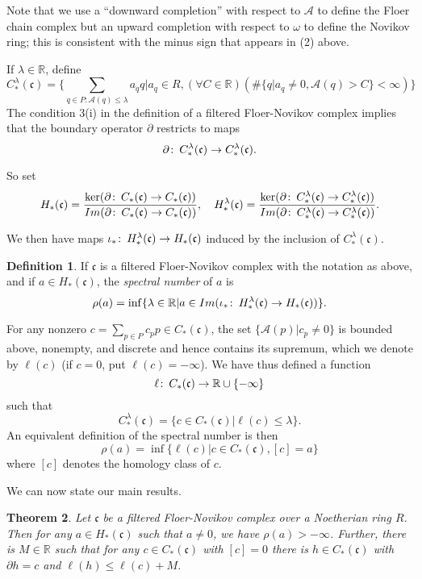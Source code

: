 \documentclass{amsart}
\theoremstyle{plain}
\newtheorem{theorem}{Theorem}[section]
\theoremstyle{definition}
\newtheorem{definition}[theorem]{Definition}
\theoremstyle{remark}
\def\co{\colon\thinspace}
\begin{document}
Note that we use a ``downward completion'' with respect to $\mathcal{A}$ to define the Floer chain complex but an upward completion with respect to $\omega$ to define the Novikov ring; this is consistent with the minus sign that appears in (2) above.  

If $\lambda\in\mathbb{R}$, define  \[ C^{\lambda}_{*}(\mathfrak{c})=\big\{\sum_{q\in P:\mathcal{A}(q)\leq\lambda}a_qq|a_q\in R,(\forall C\in\mathbb{R})(\#\{q|a_q\neq 0,\mathcal{A}(q)>C\}<\infty) \big\} \] 
The condition 3(i) in the definition of a  filtered Floer-Novikov complex implies that the boundary operator $\partial$ restricts to maps \[ \partial\co C^{\lambda}_{*}(\mathfrak{c})\to C^{\lambda}_{*}(\mathfrak{c}).\]

So set \begin{align*} 
H_{*}(\mathfrak{c})=\frac{\ker(\partial \co C_*(\mathfrak{c})\to C_*(\mathfrak{c}))}{Im(\partial \co C_*(\mathfrak{c})\to C_*(\mathfrak{c}))},
\quad 
H_{*}^{\lambda}(\mathfrak{c})=\frac{\ker(\partial \co C_{*}^{\lambda}(\mathfrak{c})\to C_{*}^{\lambda}(\mathfrak{c}))}{Im(\partial \co C_{*}^{\lambda}(\mathfrak{c})\to C_{*}^{\lambda}(\mathfrak{c}))}.
\end{align*}

 We then have maps $\iota_*\co H_{*}^{\lambda}(\mathfrak{c})\to H_{*}(\mathfrak{c})$ induced by the inclusion of $C_{*}^{\lambda}(\mathfrak{c})$.  

\begin{definition} If $\mathfrak{c}$ is a   filtered Floer-Novikov complex with the notation as above, and if $a\in H_*(\mathfrak{c})$, the \emph{spectral number} of $a$ is \[ \rho(a)=\inf\{\lambda\in\mathbb{R}|a\in Im(\iota_*\co H_{*}^{\lambda}(\mathfrak{c})\to H_{*}(\mathfrak{c}))\}.\]
\end{definition}

For any nonzero $c=\sum_{p\in P}c_pp\in C_{*}(\mathfrak{c})$, the set $\{\mathcal{A}(p)|c_p\neq 0\}$ is bounded above, nonempty, and discrete and hence contains its supremum, which we denote by $\ell(c)$ (if $c=0$, put $\ell(c)=-\infty$).  We have thus defined a function \[ \ell\co C_*(\mathfrak{c})\to\mathbb{R}\cup\{-\infty\} \] such that \[ C_{*}^{\lambda}(\mathfrak{c})=\{c\in C_{*}(\mathfrak{c})|\ell(c)\leq\lambda\}.\]  An equivalent definition of the spectral number is then \[ \rho(a)=\inf\{\ell(c)|c\in C_*(\mathfrak{c}),[c]=a\}\] where $[c]$ denotes the homology class of $c$.

We can now state our main results.

\begin{theorem} \label{nontriv}  Let $\mathfrak{c}$ be a filtered Floer-Novikov complex over a Noetherian ring $R$.  Then for any $a\in H_*(\mathfrak{c})$ such that $a\neq 0$, we have $\rho(a)>-\infty$.  Further, there is $M\in\mathbb{R}$ such that for any $c\in C_*(\mathfrak{c})$ with $[c]=0$ there is $h\in C_*(\mathfrak{c})$ with $\partial h=c$ and $\ell(h)\leq \ell(c)+M$.\end{theorem}
\end{document}
